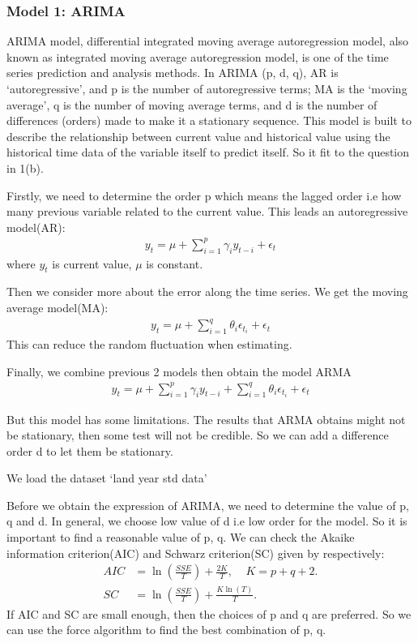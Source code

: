 \documentclass{apmcmthesis}
\begin{document}
\subsubsection{Model 1: ARIMA}

ARIMA model, differential integrated moving average autoregression model, also known as integrated moving average autoregression model, 
is one of the time series prediction and analysis methods.
In ARIMA (p, d, q), AR is `autoregressive', and p is the number of autoregressive terms; 
MA is the `moving average', q is the number of moving average terms, and d is the number of differences (orders) made to make it a stationary sequence.
This model is built to describe the relationship between current value and historical value using the historical time data of the variable itself to predict itself.
So it fit to the question in 1(b).

Firstly, we need to determine the order p which means the lagged order i.e how many previous variable related to the current value.
This leads an autoregressive model(AR):
\begin{align*}
  y_t = \mu + \sum^p_{i=1} \gamma_i y_{t-i} + \epsilon_t
\end{align*}
where $y_t$ is current value, $\mu$ is constant.

Then we consider more about the error along the time series. 
We get the moving average model(MA):
\begin{align*}
  y_t = \mu + \sum^q_{i=1} \theta_i \epsilon_{t_i} + \epsilon_t
\end{align*}
This can reduce the random fluctuation when estimating. 

Finally, we combine previous 2 models then obtain the model ARMA
\begin{align*}
  y_t = \mu + \sum^p_{i=1} \gamma_i y_{t-i}  + \sum^q_{i=1} \theta_i \epsilon_{t_i} + \epsilon_t
\end{align*}

But this model has some limitations.
The results that ARMA obtains might not be stationary, then some test will not be credible. 
So we can add a difference order d to let them be stationary. 

We load the dataset `land year std data'

Before we obtain the expression of ARIMA, we need to determine the value of p, q and d.
In general, we choose low value of d i.e low order for the model. 
So it is important to find a reasonable value of p, q.
We can check the Akaike information criterion(AIC) and Schwarz criterion(SC) 
given by respectively:
\begin{align*}
  AIC&=\ln(\frac{SSE}{T})+\frac{2K}{T},\;\;\;\;K=p+q+2.\\
  SC&=\ln(\frac{SSE}{T})+\frac{K\ln(T)}{T}.
\end{align*}
If AIC and SC are small enough, then the choices of p and q are preferred.
So we can use the force algorithm to find the best combination of p, q.
\end{document}
